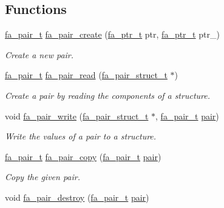 \subsection*{Functions}
\begin{DoxyCompactItemize}
\item 
\hyperlink{group___fa_pair_gac2b2e58c230bac4f8a63ef6c05072680}{fa\-\_\-pair\-\_\-t} \hyperlink{group___fa_pair_gaea210809bc766ec6aad0580f19f479ac}{fa\-\_\-pair\-\_\-create} (\hyperlink{group___fa_ga915ddeae99ad7568b273d2b876425197}{fa\-\_\-ptr\-\_\-t} ptr, \hyperlink{group___fa_ga915ddeae99ad7568b273d2b876425197}{fa\-\_\-ptr\-\_\-t} ptr\-\_\-)
\begin{DoxyCompactList}\small\item\em Create a new pair. \end{DoxyCompactList}\item 
\hyperlink{group___fa_pair_gac2b2e58c230bac4f8a63ef6c05072680}{fa\-\_\-pair\-\_\-t} \hyperlink{group___fa_pair_gaab0cee4f61bbfa9ba432a5d3b32dd1af}{fa\-\_\-pair\-\_\-read} (\hyperlink{structfa__pair__struct__t}{fa\-\_\-pair\-\_\-struct\-\_\-t} $\ast$)
\begin{DoxyCompactList}\small\item\em Create a pair by reading the components of a structure. \end{DoxyCompactList}\item 
void \hyperlink{group___fa_pair_gab613de74384324db6bba7ad7e6396892}{fa\-\_\-pair\-\_\-write} (\hyperlink{structfa__pair__struct__t}{fa\-\_\-pair\-\_\-struct\-\_\-t} $\ast$, \hyperlink{group___fa_pair_gac2b2e58c230bac4f8a63ef6c05072680}{fa\-\_\-pair\-\_\-t} \hyperlink{util_8h_a40ed40659d2ed7f8712b0fe6ba6edebe}{pair})
\begin{DoxyCompactList}\small\item\em Write the values of a pair to a structure. \end{DoxyCompactList}\item 
\hyperlink{group___fa_pair_gac2b2e58c230bac4f8a63ef6c05072680}{fa\-\_\-pair\-\_\-t} \hyperlink{group___fa_pair_ga2786421b334c7a6dc71b7f25de3369e1}{fa\-\_\-pair\-\_\-copy} (\hyperlink{group___fa_pair_gac2b2e58c230bac4f8a63ef6c05072680}{fa\-\_\-pair\-\_\-t} \hyperlink{util_8h_a40ed40659d2ed7f8712b0fe6ba6edebe}{pair})
\begin{DoxyCompactList}\small\item\em Copy the given pair. \end{DoxyCompactList}\item 
void \hyperlink{group___fa_pair_ga1ac2fe345d109b9ad18335ada198d506}{fa\-\_\-pair\-\_\-destroy} (\hyperlink{group___fa_pair_gac2b2e58c230bac4f8a63ef6c05072680}{fa\-\_\-pair\-\_\-t} \hyperlink{util_8h_a40ed40659d2ed7f8712b0fe6ba6edebe}{pair})

\end{DoxyCompactItemize}
